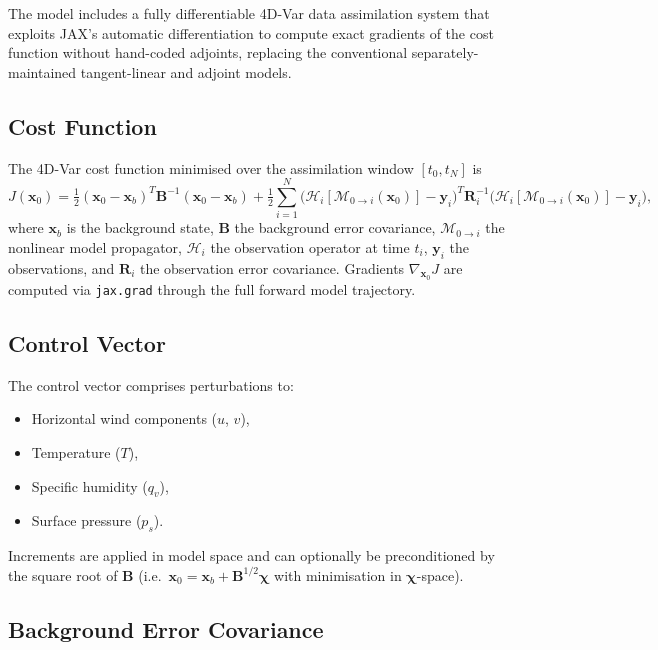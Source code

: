 \documentclass[11pt,a4paper]{article}
\newcommand{\half}{\tfrac{1}{2}}
\begin{document}
The model includes a fully differentiable 4D-Var data assimilation system \citep{Courtier1994,Rabier2000} that exploits JAX's automatic differentiation to compute exact gradients of the cost function without hand-coded adjoints, replacing the conventional separately-maintained tangent-linear and adjoint models.

\subsection{Cost Function}

The 4D-Var cost function minimised over the assimilation window $[t_0,t_N]$ is
\begin{equation}
  J(\bm x_0) = \half(\bm x_0-\bm x_b)^T \bm B^{-1}(\bm x_0-\bm x_b)
  + \half\sum_{i=1}^{N}\bigl(\mathcal H_i[\mathcal M_{0\to i}(\bm x_0)]-\bm y_i\bigr)^T \bm R_i^{-1}\bigl(\mathcal H_i[\mathcal M_{0\to i}(\bm x_0)]-\bm y_i\bigr),
\end{equation}
where $\bm x_b$ is the background state, $\bm B$ the background error covariance, $\mathcal M_{0\to i}$ the nonlinear model propagator, $\mathcal H_i$ the observation operator at time $t_i$, $\bm y_i$ the observations, and $\bm R_i$ the observation error covariance.  Gradients $\nabla_{\bm x_0}J$ are computed via \texttt{jax.grad} through the full forward model trajectory.

\subsection{Control Vector}

The control vector comprises perturbations to:
\begin{itemize}[nosep]
  \item Horizontal wind components ($u$, $v$),
  \item Temperature ($T$),
  \item Specific humidity ($q_v$),
  \item Surface pressure ($p_s$).
\end{itemize}
Increments are applied in model space and can optionally be preconditioned by the square root of $\bm B$ (i.e.\ $\bm x_0 = \bm x_b + \bm B^{1/2}\bm\chi$ with minimisation in $\bm\chi$-space).

\subsection{Background Error Covariance}
\end{document}
